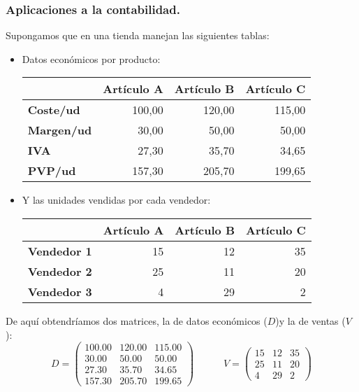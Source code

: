 \documentclass[a4paper,11pt,answers]{exam}
\begin{document}
\subsubsection{Aplicaciones a la contabilidad.}
Supongamos que en una tienda manejan las siguientes tablas:
\begin{itemize}
	\item Datos económicos por producto:\\
	\begin{center}
		\begin{tabular}{l|r|r|r|}
			\cline{2-4}
			& \multicolumn{1}{l|}{\textbf{Artículo A}} & \multicolumn{1}{l|}{\textbf{Artículo B}} & \multicolumn{1}{l|}{\textbf{Artículo C}} \\ \hline
			\multicolumn{1}{|l|}{\textbf{Coste/ud}}  & 100,00& 120,00& 115,00\\ \hline
			\multicolumn{1}{|l|}{\textbf{Margen/ud}} & 30,00& 50,00& 50,00\\ \hline
			\multicolumn{1}{|l|}{\textbf{IVA}}       & 27,30& 35,70& 34,65\\ \hline
			\multicolumn{1}{|l|}{\textbf{PVP/ud}}    & 157,30& 205,70& 199,65\\ \hline
		\end{tabular}
	\end{center}
	\item Y las unidades vendidas por cada vendedor:\\
	\begin{center}
		\begin{tabular}{l|r|r|r|}
			\cline{2-4}
			& \multicolumn{1}{l|}{\textbf{Artículo A}} & \multicolumn{1}{l|}{\textbf{Artículo B}} & \multicolumn{1}{l|}{\textbf{Artículo C}} \\ \hline
			\multicolumn{1}{|l|}{\textbf{Vendedor 1}} & 15& 12& 35\\ \hline
			\multicolumn{1}{|l|}{\textbf{Vendedor 2}} & 25& 11& 20\\ \hline
			\multicolumn{1}{|l|}{\textbf{Vendedor 3}} & 4& 29& 2\\ \hline
		\end{tabular}
	\end{center}
\end{itemize}
De aquí obtendríamos dos matrices, la de datos económicos ($D$)y la de ventas ($V$):
\[D=\left(\begin{array}{rrr}
	100.00& 120.00& 115.00\\
	30.00& 50.00& 50.00\\ 
	27.30& 35.70& 34.65\\ 
	157.30& 205.70& 199.65
\end{array}\right)\quad\quad\quad V=\left(\begin{array}{rrr}
	15& 12& 35\\ 
	25& 11& 20\\
	4& 29& 2
\end{array}\right)\]
\end{document}

